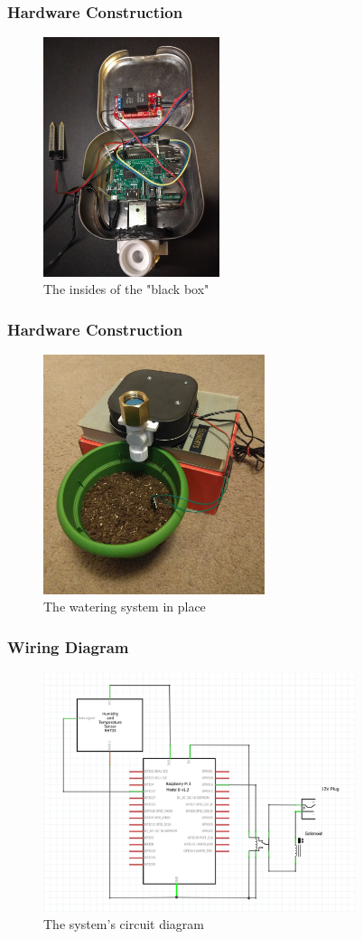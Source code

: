 \documentclass{beamer}
\begin{document}
\begin{frame}
    \frametitle{Hardware Construction} %
    \begin{figure}
        \includegraphics[height=7cm]{img/the-guts}
        \caption{The insides of the "black box"}
    \end{figure}
\end{frame}

\begin{frame}
    \frametitle{Hardware Construction} %
    \begin{figure}
        \includegraphics[height=7cm]{img/in-use}
        \caption{The watering system in place}
    \end{figure}
\end{frame}

\begin{frame}
    \frametitle{Wiring Diagram}
    \begin{figure}
        \includegraphics[height=7cm]{img/circuit}
        \caption{The system's circuit diagram}
    \end{figure}
\end{frame}
\end{document}
